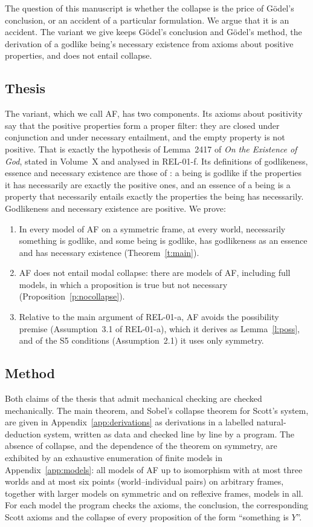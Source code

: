 \documentclass{situationist-preprint}
\begin{document}
The question of this manuscript is whether the collapse is the price of Gödel's conclusion, or an accident of a particular formulation. We argue that it is an accident. The variant we give keeps Gödel's conclusion and Gödel's method, the derivation of a godlike being's necessary existence from axioms about positive properties, and does not entail collapse.

\subsection{Thesis}

The variant, which we call AF, has two components. Its axioms about positivity say that the positive properties form a proper filter: they are closed under conjunction and under necessary entailment, and the empty property is not positive. That is exactly the hypothesis of Lemma~2417 of \emph{On the Existence of God}, stated in Volume~X and analysed in REL-01-f. Its definitions of godlikeness, essence and necessary existence are those of \citet{Anderson1990}: a being is godlike if the properties it has necessarily are exactly the positive ones, and an essence of a being is a property that necessarily entails exactly the properties the being has necessarily. Godlikeness and necessary existence are positive. We prove:

\begin{enumerate}[label=(\roman*)]
\item In every model of AF on a symmetric frame, at every world, necessarily something is godlike, and some being is godlike, has godlikeness as an essence and has necessary existence (Theorem~\ref{t:main}).
\item AF does not entail modal collapse: there are models of AF, including full models, in which a proposition is true but not necessary (Proposition~\ref{p:nocollapse}).
\item Relative to the main argument of REL-01-a, AF avoids the possibility premise (Assumption~3.1 of REL-01-a), which it derives as Lemma~\ref{l:poss}, and of the S5 conditions (Assumption~2.1) it uses only symmetry.
\end{enumerate}

\subsection{Method}

Both claims of the thesis that admit mechanical checking are checked mechanically. The main theorem, and Sobel's collapse theorem for Scott's system, are given in Appendix~\ref{app:derivations} as derivations in a labelled natural-deduction system, written as data and checked line by line by a program. The absence of collapse, and the dependence of the theorem on symmetry, are exhibited by an exhaustive enumeration of finite models in Appendix~\ref{app:models}: all models of AF up to isomorphism with at most three worlds and at most six points (world--individual pairs) on arbitrary frames, together with larger models on symmetric and on reflexive frames, \csModels{} models in all. For each model the program checks the axioms, the conclusion, the corresponding Scott axioms and the collapse of every proposition of the form \enquote{something is $Y$}.
\end{document}
